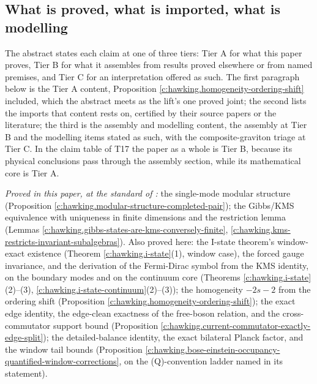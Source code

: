 \documentclass[11pt]{article}
\theoremstyle{definition}
\theoremstyle{plain}
\begin{document}
\subsection*{What is proved, what is imported, what is modelling}
\label{c:note.hawking.setting-what-proved-what-imported-what}
The abstract states each claim at one of three tiers: Tier A for what this paper proves, Tier B for what it assembles from results proved elsewhere or from named premises, and Tier C for an interpretation offered as such. The first paragraph below is the Tier A content, Proposition \ref{c:hawking.homogeneity-ordering-shift} included, which the abstract meets as the lift's one proved joint; the second lists the imports that content rests on, certified by their source papers or the literature; the third is the assembly and modelling content, the assembly at Tier B and the modelling items stated as such, with the composite-graviton triage at Tier C. In the claim table of T17 \cite{ButlerT17} the paper as a whole is Tier B, because its physical conclusions pass through the assembly section, while its mathematical core is Tier A.

\emph{Proved in this paper, at the standard of \cite{ButlerT1}:} the single-mode modular structure (Proposition \ref{c:hawking.modular-structure-completed-pair}); the Gibbs/KMS equivalence with uniqueness in finite dimensions and the restriction lemma (Lemmas \ref{c:hawking.gibbs-states-are-kms-conversely-finite}, \ref{c:hawking.kms-restricts-invariant-subalgebras}). Also proved here: the I-state theorem's window-exact existence (Theorem \ref{c:hawking.i-state}(1), window case), the forced gauge invariance, and the derivation of the Fermi-Dirac symbol from the KMS identity, on the boundary modes and on the continuum core (Theorems \ref{c:hawking.i-state}(2)--(3), \ref{c:hawking.i-state-continuum}(2)--(3)); the homogeneity $-2s-2$ from the ordering shift (Proposition \ref{c:hawking.homogeneity-ordering-shift}); the exact edge identity, the edge-clean exactness of the free-boson relation, and the cross-commutator support bound (Proposition \ref{c:hawking.current-commutator-exactly-edge-split}); the detailed-balance identity, the exact bilateral Planck factor, and the window tail bounds (Proposition \ref{c:hawking.bose-einstein-occupancy-quantified-window-corrections}, on the (Q)-convention ladder named in its statement).
\end{document}
